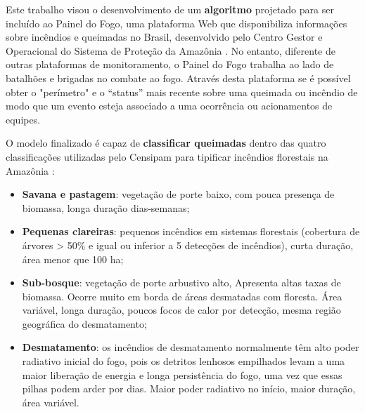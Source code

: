 Este trabalho visou o desenvolvimento de um \textbf{algoritmo} projetado para ser incluído ao Painel do Fogo, uma plataforma Web que disponibiliza informações sobre incêndios e queimadas no Brasil, desenvolvido pelo Centro Gestor e Operacional do Sistema de Proteção da Amazônia \cite{painel-fogo}. No entanto, diferente de outras plataformas de monitoramento, o Painel do Fogo trabalha ao lado de batalhões e brigadas no combate ao fogo. Através desta plataforma se é possível obter o "perímetro" e o “status” mais recente sobre uma queimada ou incêndio de modo que um evento esteja associado a uma ocorrência ou acionamentos de equipes.

O modelo finalizado é capaz de \textbf{classificar queimadas} dentro das quatro classificações utilizadas pelo Censipam para tipificar incêndios florestais na Amazônia \cite{andela}: 


\begin{itemize}
    \item  \textbf{Savana e pastagem}: vegetação de porte baixo, com pouca presença de biomassa, longa duração dias-semanas;
    \item \textbf{Pequenas clareiras}: pequenos incêndios em sistemas florestais (cobertura de árvores > 50$\%$ e igual ou inferior a 5 detecções de incêndios), curta duração, área menor que 100 ha;
    \item \textbf{Sub-bosque}: vegetação de porte arbustivo alto, Apresenta altas taxas de biomassa. Ocorre muito em borda de áreas desmatadas com floresta. Área variável, longa duração, poucos focos de calor por detecção, mesma região geográfica do desmatamento;
    \item \textbf{Desmatamento}: os incêndios de desmatamento normalmente têm alto poder radiativo inicial do fogo, pois os detritos lenhosos empilhados levam a uma maior liberação de energia e longa persistência do fogo, uma vez que essas pilhas podem arder por dias. Maior poder radiativo no início, maior duração, área variável.

\end{itemize} 

